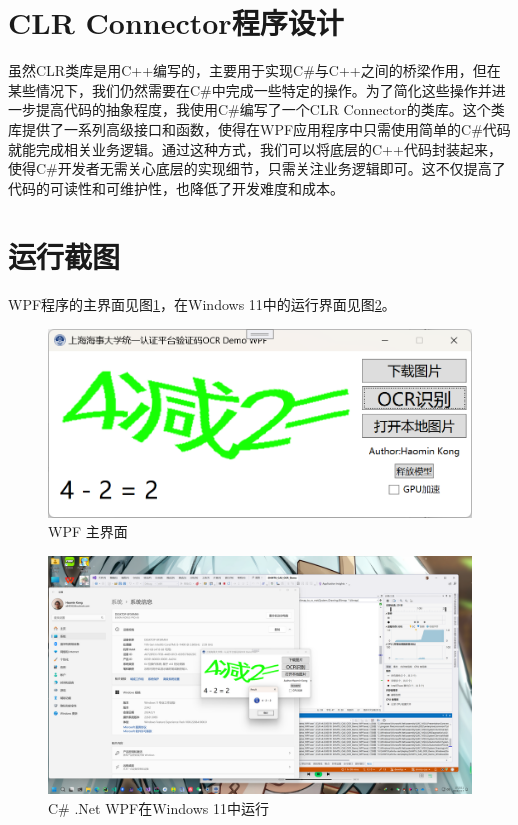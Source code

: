 \section{CLR Connector程序设计}

虽然CLR类库是用C++编写的，主要用于实现C\#与C++之间的桥梁作用，但在某些情况下，我们仍然需要在C\#中完成一些特定的操作。为了简化这些操作并进一步提高代码的抽象程度，我使用C\#编写了一个CLR Connector的类库。这个类库提供了一系列高级接口和函数，使得在WPF应用程序中只需使用简单的C\#代码就能完成相关业务逻辑。通过这种方式，我们可以将底层的C++代码封装起来，使得C\#开发者无需关心底层的实现细节，只需关注业务逻辑即可。这不仅提高了代码的可读性和可维护性，也降低了开发难度和成本。

\section{运行截图}

WPF程序的主界面见图\ref{fig:wpfmain}，在Windows 11中的运行界面见图\ref{fig:dotnetwindows}。

\begin{figure}
	\centering
	\includegraphics[width=0.9\linewidth]{Resources/Picture/Deploy/Windows/DotNet/wpf_main}
	\caption{WPF 主界面}
	\label{fig:wpfmain}
\end{figure}

\begin{figure}
	\centering
	\includegraphics[width=0.9\linewidth]{Resources/Picture/Deploy/Windows/DotNet/DotNet_Windows}
	\caption{C\# .Net WPF在Windows 11中运行}
	\label{fig:dotnetwindows}
\end{figure}
